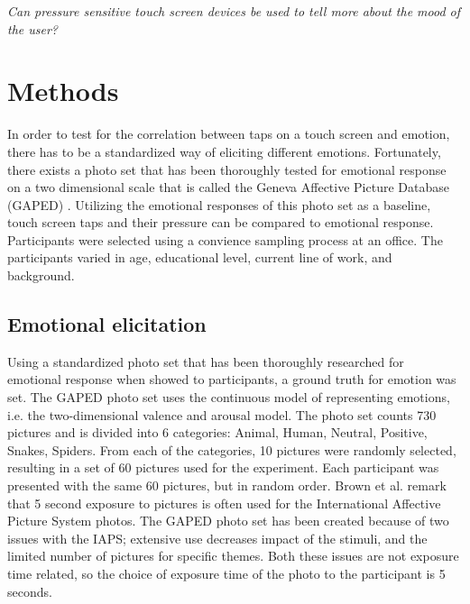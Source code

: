 \documentclass{sig-alternate}
\begin{document}
\textit{Can pressure sensitive touch screen devices be used to tell more about the mood of the user?}\\


\section{Methods} %
\label{sec:methods}
In order to test for the correlation between taps on a touch screen and emotion, there has to be a standardized way of eliciting different emotions. Fortunately, there exists a photo set that has been thoroughly tested for emotional response on a two dimensional scale that is called the Geneva Affective Picture Database (GAPED) \cite{Dan-glauser2011}. Utilizing the emotional responses of this photo set as a baseline, touch screen taps and their pressure can be compared to emotional response.
Participants were selected using a convience sampling process at an office. The participants varied in age, educational level, current line of work, and background.

\subsection{Emotional elicitation} %
\label{sub:emotional_elicitation}
Using a standardized photo set that has been thoroughly researched for emotional response when showed to participants, a ground truth for emotion was set. The GAPED photo set uses the continuous model of representing emotions, i.e. the two-dimensional valence and arousal model. The photo set counts 730 pictures and is divided into 6 categories: Animal, Human, Neutral, Positive, Snakes, Spiders. From each of the categories, 10 pictures were randomly selected, resulting in a set of 60 pictures used for the experiment. Each participant was presented with the same 60 pictures, but in random order.
Brown et al. \cite{Neuroscience2012} remark that 5 second exposure to pictures is often used for the International Affective Picture System photos. The GAPED photo set has been created because of two issues with the IAPS; extensive use decreases impact of the stimuli, and the limited number of pictures for specific themes. Both these issues are not exposure time related, so the choice of exposure time of the photo to the participant is 5 seconds.
\end{document}

